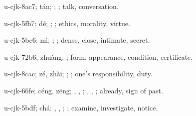 \begin{multicols}{2}
{\cjkgGlue{}u-cjk-8ac7; tán; \cjkgGlue{}; \cjkgGlue{}; talk, conversation.

\cjkgGlue{}u-cjk-5fb7; dé; \cjkgGlue{}; \cjkgGlue{}; ethics, morality, virtue.

\cjkgGlue{}u-cjk-5bc6; mì; \cjkgGlue{}\cjkgGlue{}\cjkgGlue{}; \cjkgGlue{}; dense, close, intimate, secret.

\cjkgGlue{}u-cjk-72b6; zhuàng; \cjkgGlue{}; form, appearance, condition, certificate.

\cjkgGlue{}u-cjk-8cac; zé, zhài; \cjkgGlue{}\cjkgGlue{}\cjkgGlue{}; \cjkgGlue{}; one's responsibility, duty.

\cjkgGlue{}u-cjk-66fe; céng, zēng; \cjkgGlue{}\cjkgGlue{}\cjkgGlue{}, \cjkgGlue{}\cjkgGlue{}\cjkgGlue{}, \cjkgGlue{}; \cjkgGlue{}, \cjkgGlue{}, \cjkgGlue{}; already, sign of past.

\cjkgGlue{}u-cjk-5bdf; chá; \cjkgGlue{}, \cjkgGlue{}, \cjkgGlue{}; \cjkgGlue{}; examine, investigate, notice.

}
\end{multicols}
